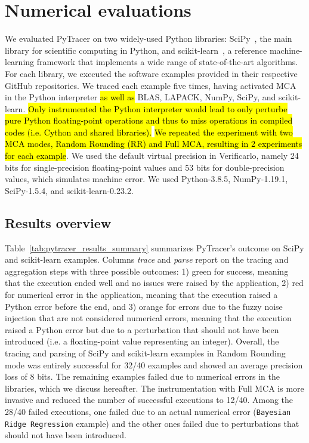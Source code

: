 \documentclass[10pt,journal,compsoc]{IEEEtran}
\newcommand{\pytracer}[0]{PyTracer\xspace}
\DeclareRobustCommand{\add}[1]{{\sethlcolor{lightgreen}\hl{#1}}}
\begin{document}
\section{Numerical evaluations}

We evaluated \pytracer on two widely-used Python libraries:
SciPy~\cite{virtanen2020scipy}, the main library for scientific computing in
Python, and  scikit-learn~\cite{pedregosa2011scikit}, a reference
machine-learning framework that implements a wide range of state-of-the-art
algorithms. For each library, we executed the software examples provided in
their respective GitHub repositories. We traced each example five times, having
activated MCA in the Python interpreter \add{as well as} BLAS, LAPACK, NumPy, SciPy, and
scikit-learn. \add{Only instrumented the Python interpreter would lead to
    only perturbe pure Python floating-point operations and thus to miss
    operations in compiled codes (i.e. Cython and shared libraries).}
\hl{We repeated the experiment with two MCA modes, Random Rounding
    (RR) and Full MCA, resulting in 2 experiments for each example}. We used the
default virtual precision in Verificarlo, namely 24 bits for single-precision
floating-point values and 53 bits for double-precision values, which simulates
machine error. We used Python-3.8.5, NumPy-1.19.1, SciPy-1.5.4, and
scikit-learn-0.23.2.

\subsection{Results overview}

Table~\ref{tab:pytracer_results_summary} summarizes \pytracer's outcome on SciPy
and scikit-learn examples. Columns \textit{trace} and \textit{parse} report on
the tracing and aggregation steps with three possible outcomes: 1) green for
success, meaning that the execution ended well and no issues were raised by the
application, 2) red for numerical error in the application, meaning that the
execution raised a Python error before the end, and 3) orange for errors due to
the fuzzy noise injection that are not considered numerical errors, meaning that
the execution raised a Python error but due to a perturbation that should not
have been introduced (i.e. a floating-point value representing an integer).
Overall, the tracing and parsing of SciPy and scikit-learn examples in Random
Rounding mode was entirely successful for 32/40 examples and showed an average
precision loss of 8 bits. The remaining examples failed due to numerical errors
in the libraries, which we discuss hereafter. The instrumentation with Full MCA
is more invasive and reduced the number of successful executions to 12/40. Among
the 28/40 failed executions, one failed due to an actual numerical error
(\texttt{Bayesian Ridge Regression} example) and the other ones failed due to
perturbations that should not have been introduced.
\end{document}
